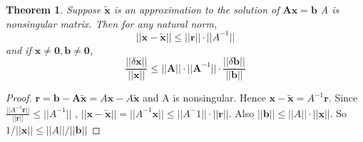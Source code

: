 \documentclass[11pt]{article}
\newtheorem{theorem}{Theorem}[section]
\newcommand{\bl}[1] {\boldsymbol{#1}}
\begin{document}
\begin{theorem}
Suppose $\tilde{\bl{x}}$ is an approximation to the solution of $ \bl{Ax=b}$
A is nonsingular matrix. Then for any natural norm,
\begin{equation*}
||\bl{x-\tilde{x}}||\le||\bl{r}||\cdot||A^{-1}||
\end{equation*}
and if $ \bl{x\neq 0, b\neq 0}$,
\begin{equation*}
\frac{||\delta\bl{x}||}{||\bl{x}||}\le||\bl{A}
||\cdot||\bl{A}^{-1}||\cdot \frac{||\delta\bl{b}||}{||\bl{b}||}
\end{equation*}
\end{theorem}

\begin{proof}
$\bl{r=b-A\tilde{x}}=A\bl{x}-A\tilde{\bl{x}}$ and A is nonsingular. Hence 
$\bl{x-\tilde{x}}=A^{-1}\bl{r}$. Since $\frac{||A^{-1}\bl{r}||}{||\bl{r}||}\le||A^{-1}||$
, $||\bl{x-\tilde{x}}||=||A^{-1}\bl{x}||\le||A^-1||\cdot||\bl{r}||$. Also
$||\bl{b}||\le||A||\cdot||\bl{x}||$. So $1/||\bl{x}||\le||A||/||\bl{b}||$
\end{proof}
\end{document}
